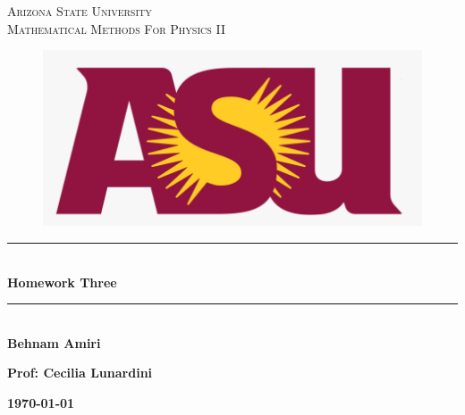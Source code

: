 \documentclass[fleqn]{article}
\begin{document}
  \begin{titlepage}

    \newcommand{\HRule}{\rule{\linewidth}{0.5mm}}

    \center



    \textsc{\LARGE Arizona State University}\\[1.5cm]

    \textsc{\LARGE Mathematical Methods For Physics II }\\[1.5cm]


    \begin{figure}
      \includegraphics[width=\linewidth]{asu.png}
    \end{figure}


    \HRule \\[0.4cm]
    { \huge \bfseries Homework Three}\\[0.4cm] 
    \HRule \\[1.5cm]

    \textbf{Behnam Amiri}

    \bigbreak

    \textbf{Prof: Cecilia Lunardini}

    \bigbreak


    \textbf{{\large \today}\\[2cm]}

    \vfill

  \end{titlepage}
\end{document}
